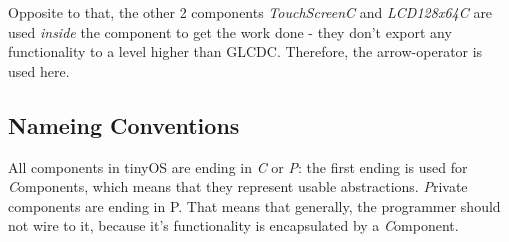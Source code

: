 Opposite to that, the other 2 components \textit{TouchScreenC} and \textit{LCD128x64C} are used \textit{inside} the component to get the work done - they don't export any functionality to a level higher than GLCDC. Therefore, the arrow-operator is used here.

\subsection{Nameing Conventions}

All components in tinyOS are ending in \textit{C} or \textit{P}: the first ending is used for \textit{C}omponents, which means that they represent usable abstractions. \textit{P}rivate components are ending in P. That means that generally, the programmer should not wire to it, because it's functionality is encapsulated by a \textit{C}omponent.


